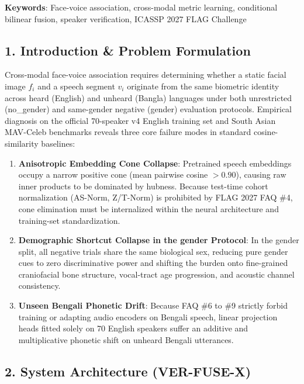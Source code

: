\documentclass[10pt,letterpaper]{article}
\providecommand{\tightlist}{\setlength{\itemsep}{0pt}\setlength{\parskip}{0pt}}
\begin{document}
\textbf{Keywords}: Face-voice association, cross-modal metric learning, conditional bilinear fusion, speaker verification, ICASSP 2027 FLAG Challenge

\subsection*{1. Introduction \& Problem Formulation}\label{introduction-problem-formulation}

Cross-modal face-voice association requires determining whether a static facial image \(f_i\) and a speech segment \(v_i\) originate from the same biometric identity across heard (\textnormal{English}) and unheard (\textnormal{Bangla}) languages under both unrestricted (\textnormal{no\_\allowbreak{}gender}) and same-gender negative (\textnormal{gender}) evaluation protocols. Empirical diagnosis on the official 70-speaker \textnormal{v4} English training set and South Asian \textnormal{MAV-Celeb} benchmarks reveals three core failure modes in standard cosine-similarity baselines:

\begin{enumerate}
\def\labelenumi{\arabic{enumi}.}
\tightlist
\item
  \textbf{Anisotropic Embedding Cone Collapse}: Pretrained speech embeddings occupy a narrow positive cone (mean pairwise cosine \(>0.90\)), causing raw inner products to be dominated by hubness. Because test-time cohort normalization (\textnormal{AS-Norm}, \textnormal{Z/T-Norm}) is prohibited by FLAG 2027 FAQ \#4, cone elimination must be internalized within the neural architecture and training-set standardization.
\item
  \textbf{Demographic Shortcut Collapse in the \textnormal{gender} Protocol}: In the \textnormal{gender} split, all negative trials share the same biological sex, reducing pure gender cues to zero discriminative power and shifting the burden onto fine-grained craniofacial bone structure, vocal-tract age progression, and acoustic channel consistency.
\item
  \textbf{Unseen Bengali Phonetic Drift}: Because FAQ \#6 to \#9 strictly forbid training or adapting audio encoders on Bengali speech, linear projection heads fitted solely on 70 English speakers suffer an additive and multiplicative phonetic shift on unheard Bengali utterances.
\end{enumerate}

\subsection*{\texorpdfstring{2. System Architecture (\textnormal{VER-FUSE-X})}{2. System Architecture (VER-FUSE-X)}}\label{system-architecture-ver-fuse-x}
\end{document}
